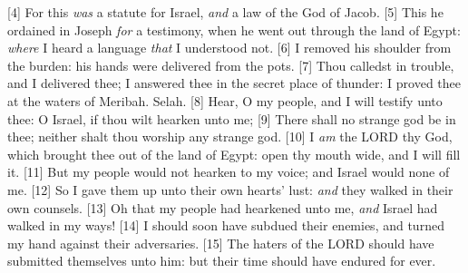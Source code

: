 [4] \textcolor[cmyk]{0.99998,1,0,0}{For this \emph{was} a statute for Israel, \emph{and} a law of the God of Jacob.}
[5] \textcolor[cmyk]{0.99998,1,0,0}{This he ordained in Joseph \emph{for} a testimony, when he went out through the land of Egypt: \emph{where} I heard a language \emph{that} I understood not.}
[6] \textcolor[cmyk]{0.99998,1,0,0}{I removed his shoulder from the burden: his hands were delivered from the pots.}
[7] \textcolor[cmyk]{0.99998,1,0,0}{Thou calledst in trouble, and I delivered thee; I answered thee in the secret place of thunder: I proved thee at the waters of Meribah. Selah.} %
[8] \textcolor[cmyk]{0.99998,1,0,0}{Hear, O my people, and I will testify unto thee: O Israel, if thou wilt hearken unto me;}
[9] \textcolor[cmyk]{0.99998,1,0,0}{There shall no strange god be in thee; neither shalt thou worship any strange god.}
[10] \textcolor[cmyk]{0.99998,1,0,0}{I \emph{am} the LORD thy God, which brought thee out of the land of Egypt: open thy mouth wide, and I will fill it.} %
[11] \textcolor[cmyk]{0.99998,1,0,0}{But my people would not hearken to my voice; and Israel would none of me.}
[12] \textcolor[cmyk]{0.99998,1,0,0}{So I gave them up unto their own hearts' lust: \emph{and} they walked in their own counsels.}
[13] \textcolor[cmyk]{0.99998,1,0,0}{Oh that my people had hearkened unto me, \emph{and} Israel had walked in my ways!}
[14] \textcolor[cmyk]{0.99998,1,0,0}{I should soon have subdued their enemies, and turned my hand against their adversaries.}
[15] \textcolor[cmyk]{0.99998,1,0,0}{The haters of the LORD should have submitted themselves unto him: but their time should have endured for ever.}
